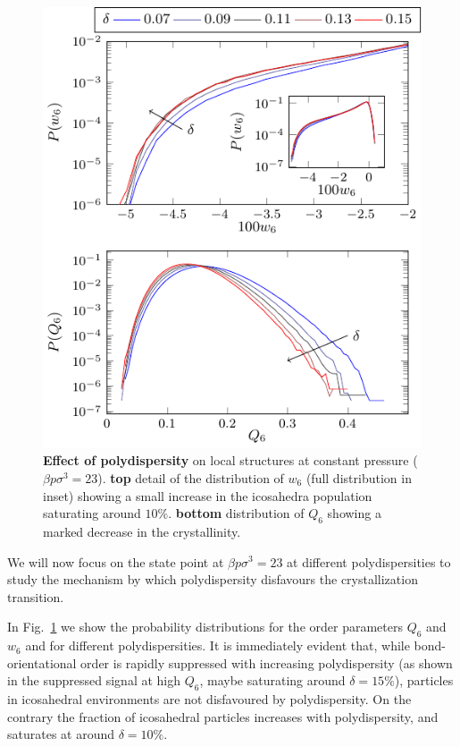\documentclass[twocolumn,superscriptaddress]{revtex4-1}
\begin{document}
\begin{figure}
 \centering
 \includegraphics{fig_polydistrib}
 \caption{\textbf{Effect of polydispersity} on local structures at constant pressure ($\beta p\sigma^3=23$). \textbf{top} detail of the distribution of $w_6$ (full distribution in inset) showing a small increase in the icosahedra population saturating around $10\%$. \textbf{bottom} distribution of $Q_6$ showing a marked decrease in the crystallinity.}
 \label{fig:polydispersity}
\end{figure}

We will now focus on the state point at $\beta p\sigma^3=23$ at different polydispersities to
study the mechanism by which polydispersity disfavours the crystallization transition.

In Fig.~\ref{fig:polydispersity} we show the probability distributions for the order
parameters $Q_6$ and $w_6$ and for different polydispersities. It is immediately
evident that, while bond-orientational order is rapidly suppressed with increasing
polydispersity (as shown in the suppressed signal at high $Q_6$, maybe saturating around $\delta=15\%$), particles in icosahedral
environments are not disfavoured by polydispersity. On the contrary the fraction of
icosahedral particles increases with polydispersity, and saturates at around $\delta=10\%$.
\end{document}
